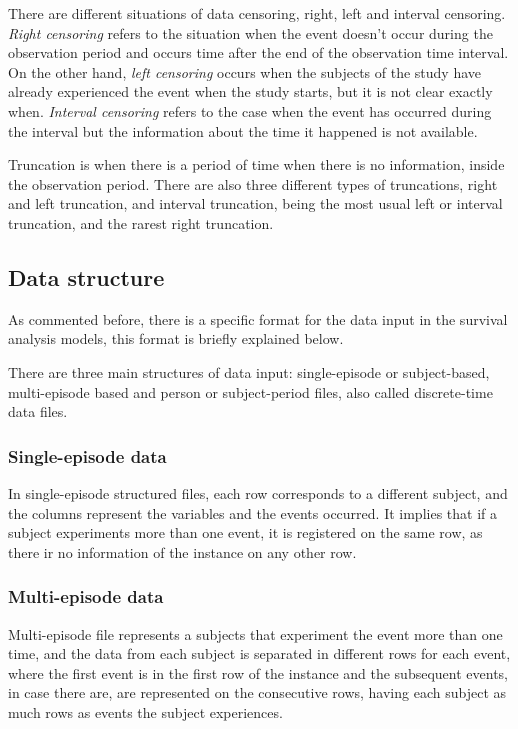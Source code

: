 \documentclass[11pt]{book} %
\begin{document}
      There are different situations of data censoring, right, left and interval censoring. \emph{Right censoring} refers to the situation when the event doesn't occur during the observation period and occurs time after the end of the observation time interval. On the other hand, \emph{left censoring} occurs when the subjects of the study have already experienced the event when the study starts, but it is not clear exactly when. \emph{Interval censoring} refers to the case when the event has occurred during the interval but the information about the time it happened is not available.

      Truncation is when there is a period of time when there is no information, inside the observation period. There are also three different types of truncations, right and left truncation, and interval truncation, being the most usual left or interval truncation, and the rarest right truncation.

    \subsection{Data structure}

      As commented before, there is a specific format for the data input in the survival analysis models, this format is briefly explained below.

      There are three main structures of data input: single-episode or subject-based, multi-episode based and person or subject-period files, also called discrete-time data files.

      \subsubsection{Single-episode data}

        In single-episode structured files, each row corresponds to a different subject, and the columns represent the variables and the events occurred. It implies that if a subject experiments more than one event, it is registered on the same row, as there ir no information of the instance on any other row.

      \subsubsection{Multi-episode data}

        Multi-episode file represents a subjects that experiment the event more than one time, and the data from each subject is separated in different rows for each event, where the first event is in the first row of the instance and the subsequent events, in case there are, are represented on the consecutive rows, having each subject as much rows as events the subject experiences.
\end{document}
